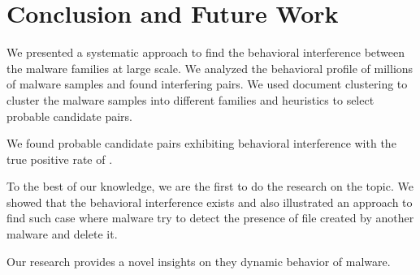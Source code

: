 \chapter{Conclusion and Future Work}\label{chapter:conclusion_and_future_work}
We presented a systematic approach to find the behavioral interference between the malware families at large scale.
We analyzed the behavioral profile of millions of malware samples and found interfering pairs.
We used document clustering to cluster the malware samples into different families and heuristics to select probable candidate pairs.

We found {\gettotalcandidatepairs{}} probable candidate pairs exhibiting behavioral interference with the true positive rate of {\gettruepositiverate{}}.


To the best of our knowledge, we are the first to do the research on the topic.
We showed that the behavioral interference exists and also illustrated an approach to find such case where malware try to detect the presence of file created by another malware and delete it.

Our research provides a novel insights on they dynamic behavior of malware.

